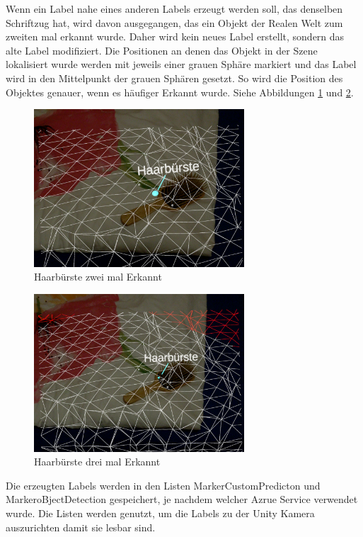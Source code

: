 Wenn ein Label nahe eines anderen Labels erzeugt werden soll, das denselben Schriftzug hat, wird davon ausgegangen, das ein Objekt der Realen Welt zum zweiten mal erkannt wurde. Daher wird kein neues Label erstellt, sondern das alte Label modifiziert.
Die Positionen an denen das Objekt in der Szene lokalisiert wurde werden mit jeweils einer grauen Sphäre markiert und das Label wird in den Mittelpunkt der grauen Sphären gesetzt.
So  wird die Position des Objektes genauer, wenn es häufiger Erkannt wurde. Siehe Abbildungen \ref{image:multi1} und \ref{image:multi2}.

\begin{figure}[H]
	\centering
	\includegraphics[width=0.7\textwidth]{images/ML_20201004_19.12.40.jpg}
	\caption[]{Haarbürste zwei mal Erkannt}
	\label{image:multi1}
\end{figure}


\begin{figure}[H]
	\centering
	\includegraphics[width=0.7\textwidth]{images/ML_20201004_19.13.07.jpg}
	\caption[]{Haarbürste drei mal Erkannt}
	\label{image:multi2}
\end{figure}


Die erzeugten Labels werden in den Listen MarkerCustomPredicton und MarkeroBjectDetection gespeichert, je nachdem welcher Azrue Service verwendet wurde. 
Die Listen werden genutzt, um die Labels zu der Unity Kamera auszurichten damit sie lesbar sind. 

